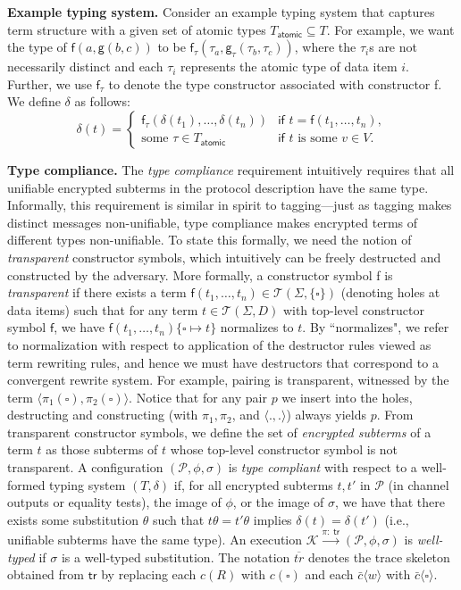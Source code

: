\documentclass{article}
\theoremstyle{definition}
\begin{document}
\textbf{Example typing system.} 
Consider an example typing system that captures term structure with a given set of atomic types 
$T_{\mathsf{atomic}} \subseteq T$. 
For example, we want the type of $\mathsf{f}(a, \mathsf{g}(b, c))$ to be 
$\mathsf{f}_\tau(\tau_a, \mathsf{g}_\tau(\tau_b, \tau_c))$, where the $\tau_i$s are not necessarily 
distinct and each $\tau_i$ represents the atomic type of data item $i$. 
Further, we use $\mathsf{f}_\tau$ to denote the type constructor associated with constructor \textsf{f}. 
We define $\delta$ as follows: 
\[
\delta(t) =
\begin{cases}
\mathsf{f}_\tau(\delta(t_1), \dots, \delta(t_n))
  & \textsf{if } t = \mathsf{f}(t_1, \dots, t_n), \\[4pt]
\text{some }\tau \in T_{\mathsf{atomic}} 
  & \textsf{if } t \text{ is some } v \in V.
\end{cases}
\]

\textbf{Type compliance.} The \textit{type compliance} requirement intuitively requires 
that all unifiable encrypted subterms in the protocol description have the same type. 
Informally, this requirement is similar in spirit to tagging---just 
as tagging makes distinct messages non-unifiable, 
type compliance makes encrypted terms of different types non-unifiable.  
To state this formally, we need the notion of \textit{transparent} constructor symbols, 
which intuitively can be freely destructed and constructed by the adversary. 
More formally, a constructor symbol \textsf{f} is \emph{transparent} if there exists a term 
$\mathsf{f}(t_1, \dots, t_n) \in \mathcal{T}(\Sigma, \{\square\})$ (denoting holes at data items) 
such that for any term $t \in \mathcal{T}(\Sigma, D)$ with top-level constructor symbol $\textsf{f}$, 
we have $\mathsf{f}(t_1, \dots, t_n)\{\square \mapsto t\}$ normalizes to $t$. 
By ``normalizes", we refer to normalization with respect to application 
of the destructor rules viewed as term rewriting rules, and hence we must have destructors 
that correspond to a convergent rewrite system. For example, pairing is transparent, 
witnessed by the term $\langle \pi_1(\square), \pi_2(\square) \rangle$. 
Notice that for any pair $p$ we insert into the holes, destructing and constructing 
(with $\pi_1, \pi_2$, and $\langle .,. \rangle$) always yields $p$. 
From transparent constructor symbols, we define the set of \emph{encrypted subterms} 
of a term $t$ as those subterms of $t$ whose top-level constructor symbol is not transparent. 
A configuration $(\mathcal{P}, \phi, \sigma)$ is \emph{type compliant} with respect 
to a well-formed typing system $(T, \delta)$ if, for all encrypted subterms $t, t'$ in $\mathcal{P}$ 
(in channel outputs or equality tests), the image of $\phi$, or the image of $\sigma$, 
we have that there exists some substitution $\theta$ such that $t \theta = t'\theta$ 
implies $\delta(t) = \delta(t')$ (i.e., unifiable subterms have the same type). 
An execution $\mathcal{K} \xrightarrow{\pi:\;\mathsf{tr}} (\mathcal{P}, \phi, \sigma)$ 
is \emph{well-typed} if $\sigma$ is a well-typed substitution. 
The notation $\overline{\mathit{tr}}$ denotes the trace skeleton obtained from $\mathsf{tr}$ 
by replacing each $c(R)$ with $c(\square)$ and each $\bar c \langle w \rangle$ 
with $\bar c \langle \square \rangle$.
\end{document}

